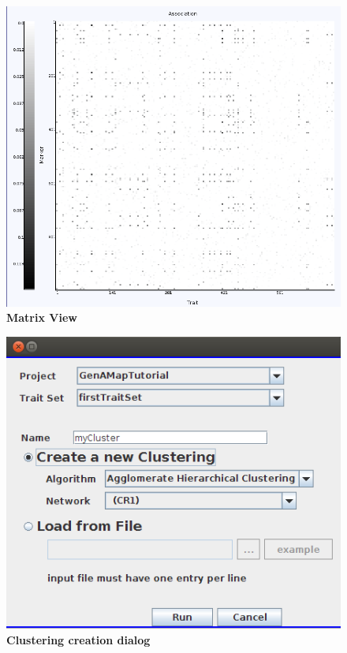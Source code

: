 \documentclass{article}
\begin{document}
\begin{figure}
\includegraphics[width=\textwidth]{matrixView.png}
\caption{\textbf{Matrix View}}
\label{matrixView}
\end{figure}

\begin{figure}
\includegraphics[width=\textwidth]{clusterCreation.png}
\caption{\textbf{Clustering creation dialog}}
\label{clusterCreation}
\end{figure}
\end{document}
